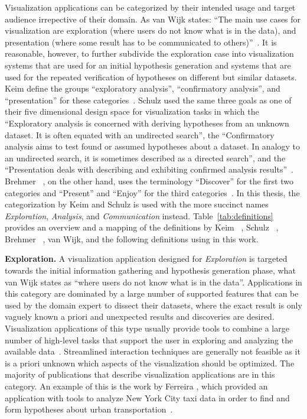 Visualization applications can be categorized by their intended usage and target audience irrepective of their domain. As van Wijk states: ``The main use cases for visualization are exploration (where users do not know what is in the data), and presentation (where some result has to be communicated to others)''~\cite{van2005value}.  It is reasonable, however, to further subdivide the exploration case into visualization systems that are used for an initial hypothesis generation and systems that are used for the repeated verification of hypotheses on different but similar datasets.  Keim \etal define the groups ``exploratory analysis'', ``confirmatory analysis'', and ``presentation'' for these categories~\cite{keim2006challenges}.  Schulz \etal used the same three goals as one of their five dimensional design space for visualization tasks in which the ``Exploratory analysis is concerned with deriving hypotheses from an unknown dataset. It is often equated with an undirected search'', the ``Confirmatory analysis aims to test found or assumed hypotheses about a dataset. In analogy to an undirected search, it is sometimes described as a directed search'', and the ``Presentation deals with describing and exhibiting confirmed analysis results''~\cite{schulz2013design}.  Brehmer \etal\ , on the other hand, uses the terminology ``Discover'' for the first two categories and ``Present'' and ``Enjoy'' for the third categories~\cite{brehmer2013typology}.  In this thesis, the categorization by Keim \etal and Schulz \etal is used with the more succinct names \emph{Exploration}, \emph{Analysis}, and \emph{Communication} instead.  Table~\ref{tab:definitions} provides an overview and a mapping of the definitions by Keim \etal\ , Schulz \etal\ , Brehmer \etal\ , van Wijk, and the following definitions using in this work.

\textbf{Exploration. }  A visualization application designed for \emph{Exploration} is targeted towards the initial information gathering and hypothesis generation phase, what van Wijk states as ``where users do not know what is in the data''.  Applications in this category are dominated by a large number of supported features that can be used by the domain expert to dissect their datasets, where the exact result is only vaguely known a priori and unexpected results and discoveries are desired.  Visualization applications of this type usually provide tools to combine a large number of high-level tasks that support the user in exploring and analyzing the available data~\cite{marchionini2006exploratory}.  Streamlined interaction techniques are generally not feasible as it is a priori unknown which aspects of the visualization should be optimized.  The majority of publications that describe visualization applications are in this category.  An example of this is the work by Ferreira \etal , which provided an application with tools to analyze New York City taxi data in order to find and form hypotheses about urban transportation~\cite{ferreira2013visual}.

